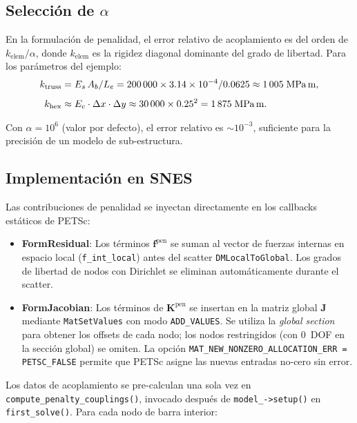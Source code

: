 \subsection{Selección de $\alpha$}

En la formulación de penalidad, el error relativo de acoplamiento es
del orden de $k_{\text{elem}} / \alpha$, donde $k_{\text{elem}}$ es
la rigidez diagonal dominante del grado de libertad.  Para los
parámetros del ejemplo:
%
\begin{align}
  k_{\text{truss}} &= E_s\,A_b / L_e
    = 200\,000 \times 3{.}14 \times 10^{-4} / 0{.}0625
    \approx 1\,005\;\text{MPa\,m}, \\[4pt]
  k_{\text{hex}} &\approx E_c \cdot \Delta x \cdot \Delta y
    \approx 30\,000 \times 0{.}25^2
    = 1\,875\;\text{MPa\,m}.
\end{align}

Con $\alpha = 10^6$ (valor por defecto), el error relativo es
$\sim 10^{-3}$, suficiente para la precisión de un modelo de
sub-estructura.

\subsection{Implementación en SNES}

Las contribuciones de penalidad se inyectan directamente en los
callbacks estáticos de PETSc:

\begin{itemize}
  \item \textbf{FormResidual}: Los términos $\mathbf{f}^{\text{pen}}$
        se suman al vector de fuerzas internas en espacio local
        (\texttt{f\_int\_local}) antes del scatter
        \texttt{DMLocalToGlobal}.  Los grados de libertad de nodos
        con Dirichlet se eliminan automáticamente durante el scatter.

  \item \textbf{FormJacobian}: Los términos de
        $\mathbf{K}^{\text{pen}}$ se insertan en la matriz global
        $\mathbf{J}$ mediante \texttt{MatSetValues} con modo
        \texttt{ADD\_VALUES}.  Se utiliza la \emph{global section}
        para obtener los offsets de cada nodo; los nodos restringidos
        (con 0~DOF en la sección global) se omiten.  La opción
        \texttt{MAT\_NEW\_NONZERO\_ALLOCATION\_ERR = PETSC\_FALSE}
        permite que PETSc asigne las nuevas entradas no-cero sin error.
\end{itemize}

Los datos de acoplamiento se pre-calculan una sola vez en
\texttt{compute\_penalty\_couplings()}, invocado después de
\texttt{model\_->setup()} en \texttt{first\_solve()}.  Para cada
nodo de barra interior:

